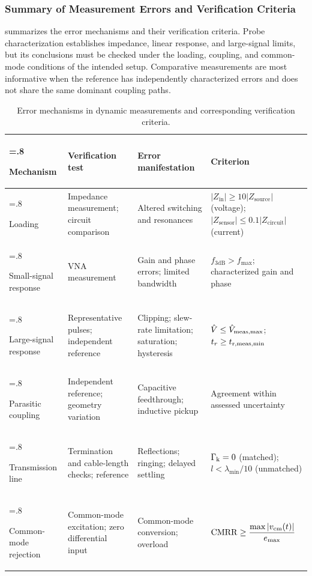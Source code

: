 \subsubsection*{Summary of Measurement Errors and Verification Criteria}

 summarizes the error mechanisms and their verification criteria.
Probe characterization establishes impedance, linear response, and large-signal limits, but its conclusions must be checked under the loading, coupling, and common-mode conditions of the intended setup.
Comparative measurements are most informative when the reference has independently characterized errors and does not share the same dominant coupling paths.

\begin{table}[htbp]
\caption{Error mechanisms in dynamic measurements and corresponding verification criteria.}
\label{tab:dynamic_measurements}
{%
\renewcommand{\tabularxcolumn}[1]{m{#1}}
    \begin{tabularx}{\textwidth}{>{\hsize=.8\hsize\raggedright\arraybackslash}X>{\hsize=1.0\hsize\raggedright\arraybackslash}X>{\hsize=1.1\hsize\raggedright\arraybackslash}X>{\hsize=1.1\hsize\raggedright\arraybackslash}X}
        \toprule
        \textbf{Mechanism} & \textbf{Verification test} & \textbf{Error manifestation} & \textbf{Criterion} \\
        \midrule
        Loading & Impedance measurement; circuit comparison & Altered switching and resonances & $|Z_{\mathrm{in}}| \geq 10|Z_{\mathrm{source}}|$ (voltage); \newline $|Z_{\mathrm{sensor}}| \leq 0.1|Z_{\mathrm{circuit}}|$ (current) \\
        \addlinespace
        Small-signal response & VNA measurement & Gain and phase errors; limited bandwidth & $f_{\mathrm{3dB}} > f_{\max}$; \newline characterized gain and phase \\
        \addlinespace
        Large-signal response & Representative pulses; independent reference & Clipping; slew-rate limitation; saturation; hysteresis & $\hat{V} \leq {\hat{V}}_{\mathrm{meas,max}}$; \newline $t_r \geq {t}_{\mathrm{r,meas,min}}$ \\
        \addlinespace
        Parasitic coupling & Independent reference; geometry variation & Capacitive feedthrough; inductive pickup & Agreement within assessed uncertainty \\
        \addlinespace
        Transmission line & Termination and cable-length checks; reference & Reflections; ringing; delayed settling & ${\Gamma}_{\mathrm{k}}=0$ (matched); \newline $l < \lambda_{\min}/10$ (unmatched) \\
        \addlinespace
        Common-mode rejection & Common-mode excitation; zero differential input & Common-mode conversion; overload & $\mathrm{CMRR} \geq \dfrac{\max |{v}_{\mathrm{cm}}(t)|}{e_{\max}}$ \\
        \bottomrule
    \end{tabularx}
}
\end{table}


